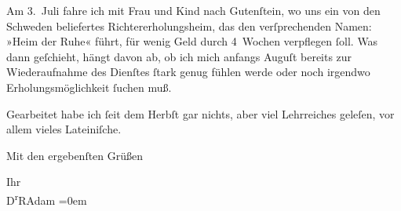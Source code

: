 \pstart
           Am 3. Juli fahre ich mit Frau und Kind nach Gutenſtein,
               wo uns ein von den Schweden beliefertes
               Richtererholungsheim, das den verſprechenden Namen: »Heim der Ruhe« führt, für wenig Geld durch 4 Wochen verpflegen{ }ſoll. Was
               dann geſchieht, hängt davon ab, ob ich mich anfangs Auguſt bereits zur
               Wiederaufnahme des Dienſtes{ }ſtark genug fühlen werde oder noch irgendwo
               Erholungsmöglichkeit{ }ſuchen muß.\pend
           
\pstart
           Gearbeitet habe ich ſeit dem Herbſt gar nichts, aber viel
               Lehrreiches geleſen, vor allem vieles Lateiniſche.\pend
           
\pstart
           {\pb}Mit den ergebenſten Grüßen\pend
           
\pstart
           Ihr{\\[\baselineskip]}\spacefill\mbox{D\textsuperscript{r}RAdam}\pend
           \leftskip=0em{}\endnumbering{}  \newcommand{\dateiname}{L02343}\newcommand{\titel}{Robert Adam an Arthur Schnitzler, 17. 6. 1920}\newcommand{\editorInnen}{Martin Anton Müller und Gerd-Hermann Susen}
